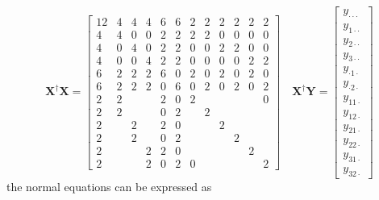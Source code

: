\documentclass{article}
\begin{document}
\begin{equation*}
\mathbf{X}^{\dagger }\mathbf{X}=\left[ 
\begin{array}{cccccccccccc}
12 & 4 & 4 & 4 & 6 & 6 & 2 & 2 & 2 & 2 & 2 & 2 \\ 
4 & 4 & 0 & 0 & 2 & 2 & 2 & 2 & 0 & 0 & 0 & 0 \\ 
4 & 0 & 4 & 0 & 2 & 2 & 0 & 0 & 2 & 2 & 0 & 0 \\ 
4 & 0 & 0 & 4 & 2 & 2 & 0 & 0 & 0 & 0 & 2 & 2 \\ 
6 & 2 & 2 & 2 & 6 & 0 & 2 & 0 & 2 & 0 & 2 & 0 \\ 
6 & 2 & 2 & 2 & 0 & 6 & 0 & 2 & 0 & 2 & 0 & 2 \\ 
2 & 2 &  &  & 2 & 0 & 2 &  &  &  &  & 0 \\ 
2 & 2 &  &  & 0 & 2 &  & 2 &  &  &  &  \\ 
2 &  & 2 &  & 2 & 0 &  &  & 2 &  &  &  \\ 
2 &  & 2 &  & 0 & 2 &  &  &  & 2 &  &  \\ 
2 &  &  & 2 & 2 & 0 &  &  &  &  & 2 &  \\ 
2 &  &  & 2 & 0 & 2 & 0 &  &  &  &  & 2%
\end{array}%
\right] \quad \mathbf{X}^{\dagger }\mathbf{Y}=\left[ 
\begin{array}{c}
y_{\cdot \cdot \cdot } \\ 
y_{1\cdot \cdot } \\ 
y_{2\cdot \cdot } \\ 
y_{3\cdot \cdot } \\ 
y_{\cdot 1\cdot } \\ 
y_{\cdot 2\cdot } \\ 
y_{11\cdot } \\ 
y_{12\cdot } \\ 
y_{21\cdot } \\ 
y_{22\cdot } \\ 
y_{31\cdot } \\ 
y_{32\cdot }%
\end{array}%
\right]
\end{equation*}%
the normal equations can be expressed as%
\end{document}
